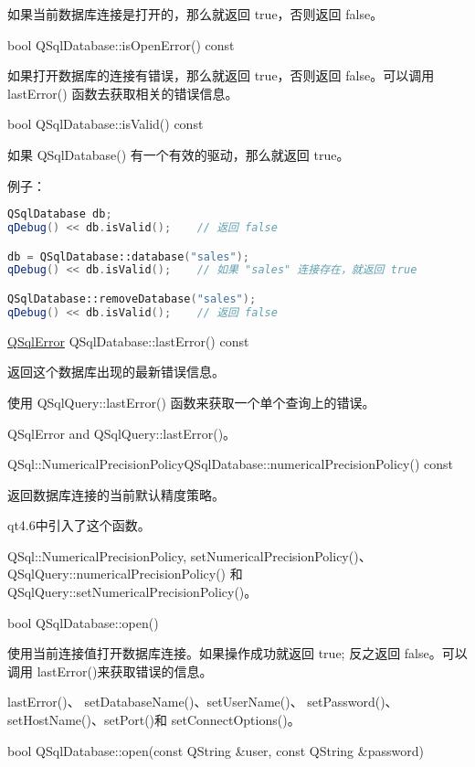 如果当前数据库连接是打开的，那么就返回 true，否则返回 false。

bool QSqlDatabase::isOpenError() const


如果打开数据库的连接有错误，那么就返回 true，否则返回 false。可以调用 lastError() 函数去获取相关的错误信息。

bool QSqlDatabase::isValid() const


如果 QSqlDatabase() 有一个有效的驱动，那么就返回 true。

例子：

\begin{lstlisting}[language=C++]
QSqlDatabase db;
qDebug() << db.isValid();    // 返回 false

db = QSqlDatabase::database("sales");
qDebug() << db.isValid();    // 如果 "sales" 连接存在，就返回 true

QSqlDatabase::removeDatabase("sales");
qDebug() << db.isValid();    // 返回 false
\end{lstlisting}

\href{https://doc.qt.io/qt-5/qsqlerror.html}{QSqlError} QSqlDatabase::lastError() const

返回这个数据库出现的最新错误信息。

使用 QSqlQuery::lastError() 函数来获取一个单个查询上的错误。

\begin{seeAlso}
QSqlError and QSqlQuery::lastError()。
\end{seeAlso}


QSql::NumericalPrecisionPolicyQSqlDatabase::numericalPrecisionPolicy() const

返回数据库连接的当前默认精度策略。

qt4.6中引入了这个函数。

\begin{seeAlso}
QSql::NumericalPrecisionPolicy, setNumericalPrecisionPolicy()、
QSqlQuery::numericalPrecisionPolicy() 和 QSqlQuery::setNumericalPrecisionPolicy()。
\end{seeAlso}

bool QSqlDatabase::open()

使用当前连接值打开数据库连接。如果操作成功就返回 true; 反之返回 false。可以调用 lastError()来获取错误的信息。

\begin{seeAlso}
lastError()、 setDatabaseName()、setUserName()、
setPassword()、setHostName()、setPort()和 setConnectOptions()。
\end{seeAlso}

bool QSqlDatabase::open(const QString \&user, const QString \&password)

